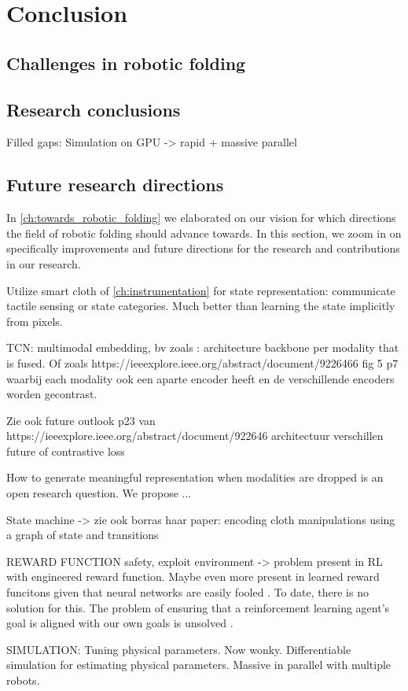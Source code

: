 \documentclass[\home/main.tex]{subfiles}
\begin{document}
\chapter{Conclusion}\label{ch:conclusion}

\section{Challenges in robotic folding}

\section{Research conclusions}
Filled gaps:
    Simulation on GPU -> rapid + massive parallel 


\section{Future research directions} \label{sec:conc_future_work}
In \cref{ch:towards_robotic_folding} we elaborated on our vision for which directions the field of robotic folding should advance towards. In this section, we zoom in on specifically improvements and future directions for the research and contributions in our research. 

Utilize smart cloth of \cref{ch:instrumentation} for state representation: communicate tactile sensing or state categories. Much better than learning the state implicitly from pixels. 


TCN:
    multimodal embedding, bv zoals \autocite{making sense of vision and touch}: architecture backbone per modality that is fused. Of zoals https://ieeexplore.ieee.org/abstract/document/9226466 fig 5 p7 waarbij each modality ook een aparte encoder heeft en de verschillende encoders worden gecontrast. 

    Zie ook future outlook p23 van https://ieeexplore.ieee.org/abstract/document/922646
        architectuur verschillen
        future of contrastive loss

    How to generate meaningful representation when modalities are dropped is an open research question. We propose ... 

    State machine -> zie ook borras haar paper: encoding cloth manipulations using a graph of state and transitions 


REWARD FUNCTION 
    safety, exploit environment -> problem present in RL with engineered reward function. Maybe even more present in learned reward funcitons given that neural networks are easily fooled \autocite{nn are easily fooled, adversarial examples}. To date, there is no solution for this. The problem of ensuring that a reinforcement learning agent’s goal is aligned with our own goals is unsolved \autocite{Sutton2018}. 

SIMULATION:
    Tuning physical parameters. Now wonky. Differentiable simulation for estimating physical parameters.
    Massive in parallel with multiple robots. 
\end{document}
